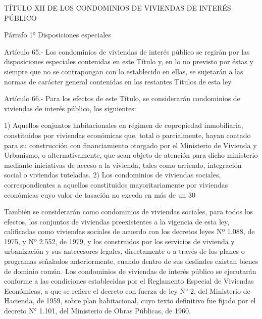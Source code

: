     TÍTULO XII
    DE LOS CONDOMINIOS DE VIVIENDAS DE INTERÉS PÚBLICO


    Párrafo 1°
    Disposiciones especiales

     
    Artículo 65.- Los condominios de viviendas de interés público se regirán por las disposiciones especiales contenidas en este Título y, en lo no previsto por éstas y siempre que no se contrapongan con lo establecido en ellas, se sujetarán a las normas de carácter general contenidas en los restantes Títulos de esta ley.
   
    Artículo 66.- Para los efectos de este Título, se considerarán condominios de viviendas de interés público, los siguientes:
     
    1) Aquellos conjuntos habitacionales en régimen de copropiedad inmobiliaria, constituidos por viviendas económicas que, total o parcialmente, hayan contado para su construcción con financiamiento otorgado por el Ministerio de Vivienda y Urbanismo, o alternativamente, que sean objeto de atención para dicho ministerio mediante iniciativas de acceso a la vivienda, tales como arriendo, integración social o viviendas tuteladas.
    2) Los condominios de viviendas sociales, correspondientes a aquellos constituidos mayoritariamente por viviendas económicas cuyo valor de tasación no exceda en más de un 30%
     
    También se considerarán como condominios de viviendas sociales, para todos los efectos, los conjuntos de viviendas preexistentes a la vigencia de esta ley, calificadas como viviendas sociales de acuerdo con los decretos leyes Nº 1.088, de 1975, y Nº 2.552, de 1979, y los construidos por los servicios de vivienda y urbanización y sus antecesores legales, directamente o a través de los planes o programas señalados anteriormente, cuando dentro de sus deslindes existan bienes de dominio común.
    Los condominios de viviendas de interés público se ejecutarán conforme a las condiciones establecidas por el Reglamento Especial de Viviendas Económicas, a que se refiere el decreto con fuerza de ley N° 2, del Ministerio de Hacienda, de 1959, sobre plan habitacional, cuyo texto definitivo fue fijado por el decreto N° 1.101, del Ministerio de Obras Públicas, de 1960.

